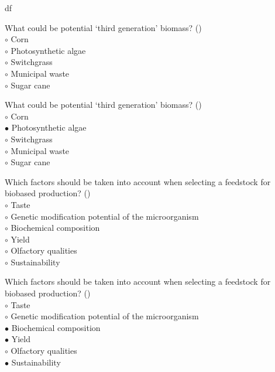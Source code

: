 df\documentclass[]{beamer}
\begin{document}
\begin{CJK}{UTF8}{gbsn}
\begin{frame}[shrink] {}
\addtocounter{questions}{1}
\color{blue}
What could be potential ‘third generation’ biomass?
({})\\
\color{black}
\setlength{\parindent}{-0.4cm}
{\color{red}$\circ$} Corn  \\
{\color{red}$\circ$}  Photosynthetic algae  \\
{\color{red}$\circ$} Switchgrass  \\
{\color{red}$\circ$} Municipal waste  \\
{\color{red}$\circ$} Sugar cane  \\
\end{frame}
\begin{frame}[shrink] {}
\addtocounter{answers}{1}
\color{blue}
What could be potential ‘third generation’ biomass?
({})\\
\color{black}
\setlength{\parindent}{-0.4cm}
{\color{red}$\circ$} Corn  \\
{\color{red}$\bullet$} Photosynthetic algae  \\
{\color{red}$\circ$} Switchgrass  \\
{\color{red}$\circ$} Municipal waste  \\
{\color{red}$\circ$} Sugar cane  \\
\end{frame}


\begin{frame}[shrink] {}
\addtocounter{questions}{1}
\color{blue}
Which factors should be taken into account when selecting a feedstock for biobased production?
({})\\
\color{black}
\setlength{\parindent}{-0.4cm}
{\color{red}$\circ$} Taste  \\
{\color{red}$\circ$} Genetic modification potential of the microorganism  \\
{\color{red}$\circ$}  Biochemical composition  \\
{\color{red}$\circ$}  Yield  \\
{\color{red}$\circ$} Olfactory qualities  \\
{\color{red}$\circ$}  Sustainability  \\
\end{frame}
\begin{frame}[shrink] {}
\addtocounter{answers}{1}
\color{blue}
Which factors should be taken into account when selecting a feedstock for biobased production?
({})\\
\color{black}
\setlength{\parindent}{-0.4cm}
{\color{red}$\circ$} Taste  \\
{\color{red}$\circ$} Genetic modification potential of the microorganism  \\
{\color{red}$\bullet$} Biochemical composition  \\
{\color{red}$\bullet$} Yield  \\
{\color{red}$\circ$} Olfactory qualities  \\
{\color{red}$\bullet$} Sustainability  \\
\end{frame}



\end{CJK}
\end{document}
